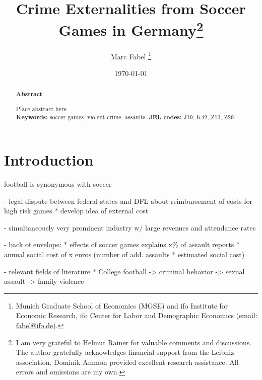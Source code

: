 \documentclass[11pt, a4paper]{article} %
\title{Crime Externalities from Soccer Games in Germany\footnote{I am very grateful to Helmut Rainer for valuable comments and discussions. The author gratefully acknowledges financial support from the Leibniz association. Dominik Ammon provided excellent research assistance. All errors and omissions are my own.
}}
\author{
	Marc Fabel 
		\thanks{Munich Graduate School of Economics (MGSE) and ifo Institute for Economic Research, ifo Center for Labor and Demographic Economics (email: \href{mailto:fabel@ifo.de}{fabel@ifo.de}).
		}
}
\date{\monthyeardate\today}
\begin{document}
\setcounter{page}{0}
\newpage
\setcounter{page}{1}
\maketitle


\renewcommand{\abstractname}{\vspace{-\baselineskip}} %
\begin{abstract}\noindent 
	\footnotesize{\begin{center}\textbf{Abstract}\end{center} Place abstract here\\\newline \textbf{Keywords:} soccer games, violent crime, assaults. \newline \textbf{JEL codes:} J19, K42, Z13, Z29.}

\end{abstract}


\newpage
\tableofcontents


\newpage
\section{Introduction}\label{sec_soc_ext:introduction}


football is synonymous with soccer 

- legal dispute between federal states and DFL about reimbursement of costs for high risk games
	* develop idea of external cost

- simultaneously very prominent industry w/ large revenues and attendance rates




		
- back of envelope: 
	* effects of soccer games explains x\% of assault reports
	* annual social cost of x euros (number of add. assaults * estimated social cost)

- relevant fields of literature
	* College football 
		-> criminal behavior \cite{rees2009college}
		-> sexual assault \cite{lindo2018college}
		-> family violence \cite{card2011family}
		
\end{document}
